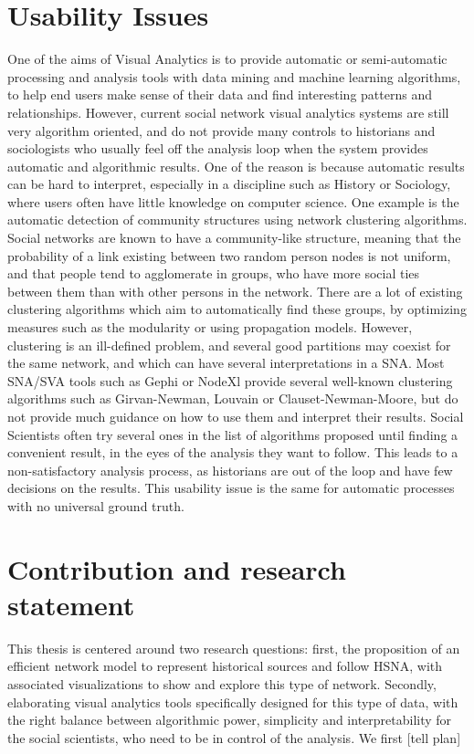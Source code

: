 \section{Usability Issues}

One of the aims of Visual Analytics is to provide automatic or semi-automatic processing and analysis tools with data mining and machine learning algorithms, to help end users make sense of their data and find interesting patterns and relationships.
However, current social network visual analytics systems are still very algorithm oriented, and do not provide many controls to historians and sociologists who usually feel off the analysis loop when the system provides automatic and algorithmic results. One of the reason is because automatic results can be hard to interpret, especially in a discipline such as History or Sociology, where users often have little knowledge on computer science.
One example is the automatic detection of community structures using network clustering algorithms. Social networks are known to have a community-like structure, meaning that the probability of a link existing between two random person nodes is not uniform, and that people tend to agglomerate in groups, who have more social ties between them than with other persons in the network.
There are a lot of existing clustering algorithms which aim to automatically find these groups, by optimizing measures such as the modularity or using propagation models.
However, clustering is an ill-defined problem, and several good partitions may coexist for the same network, and which can have several interpretations in a SNA. Most SNA/SVA tools such as Gephi or NodeXl provide several well-known clustering algorithms such as Girvan-Newman, Louvain or Clauset-Newman-Moore, but do not provide much guidance on how to use them and interpret their results.
Social Scientists often try several ones in the list of algorithms proposed until finding a convenient result, in the eyes of the analysis they want to follow.
This leads to a non-satisfactory analysis process, as historians are out of the loop and have few decisions on the results. This usability issue is the same for automatic processes with no universal ground truth.

\section{Contribution and research statement}

This thesis is centered around two research questions: first, the proposition of an efficient network model to represent historical sources and follow HSNA, with associated visualizations to show and explore this type of network. Secondly, elaborating visual analytics tools specifically designed for this type of data, with the right balance between algorithmic power, simplicity and interpretability for the social scientists, who need to be in control of the analysis. We first [tell plan]


